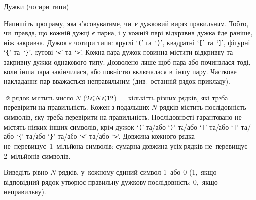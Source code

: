 ﻿\begin{problemAllDefault}{Дужки (чотири типи)}

Напишіть програму, яка з'ясовуватиме, чи~є дужковий вираз правильним. Тобто, чи~правда, що кожній дужці є парна, і у кожній парі відкривна дужка йде раніше, ніж закривна. Дужок є чотири типи: круглі `\texttt{(}' та~`\texttt{)}', квадратні `\texttt{[}' та~`\texttt{]}', фігурні `\texttt{\{}' та~`\texttt{\}}', кутові `\texttt{<}' та~`\texttt{>}'. Кожна пара дужок повинна містити відкривну та закривну дужки однакового типу. Дозволено лише щоб пара або починалася тоді, коли інша пара закінчилася, або повністю включалася в~іншу пару. Часткове накладання пар вважається неправильним (див.~останній рядок прикладу).

-й рядок містить число $N$ ($2{\leqslant}N{\leqslant}12$) --- кількість різних рядків, які треба перевірити на правильність. Кожен з подальших $N$ рядків містить послідовність символів, яку треба перевірити на правильність. Послідовності гарантовано не містять ніяких інших символів, крім дужок `\texttt{(}' та/або `\texttt{)}' та/або `\texttt{[}' та/або `\texttt{]}' та/або `\texttt{\{}' та/або `\texttt{\}}' та/або `\texttt{<}' та/або~`\texttt{>}'. Довжина кожного рядка не~перевищує~1~мільйона символів; сумарна довжина усіх рядків не~перевищує 2~мільйонів символів.

\OutputFile
Виведіть рівно $N$ рядків, у~кожному єдиний символ 1~або~0 (1,~якщо відповідний рядок утворює правильну дужкову послідовність; 0,~якщо неправильну).


\Example

\begin{example}
%
\end{example}

\end{problemAllDefault}

